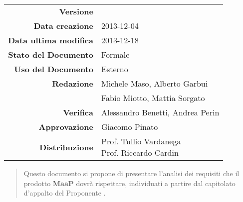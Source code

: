 

\newcommand{\Versione}{\versioneAnalisiDeiRequisiti{}}	%
\newcommand{\Data}{2013-12-04}							%
\newcommand{\DataUltimaModifica}{2013-12-18}
\newcommand{\TipoDocumento}{Analisi dei Requisiti}		%






\begin{center}
\begin{tabular}{r|l}
\textbf{Versione} & \Versione{} \\
\textbf{Data creazione} & \Data{} \\
\textbf{Data ultima modifica} & \DataUltimaModifica{} \\
\textbf{Stato del Documento} & Formale \\					%
\textbf{Uso del Documento} & Esterno \\						%
\textbf{Redazione} & Michele Maso, Alberto Garbui\\			%
				   & Fabio Miotto, Mattia Sorgato\\
\textbf{Verifica} & Alessandro Benetti, Andrea Perin\\		%
\textbf{Approvazione} & Giacomo Pinato\\					%
\textbf{Distribuzione} & \parbox[t]{4cm}{Prof. Tullio Vardanega \\ Prof. Riccardo Cardin \\ \Prop{} }\\
\end{tabular}
\end{center}

\vspace{0.05in}

\begin{abstract}
\begin{center}
Questo documento si propone di presentare l'analisi dei requisiti che il prodotto \textbf{MaaP} dovrà rispettare, individuati a partire dal capitolato d'appalto del Proponente \Prop{}.
\end{center}
\end{abstract}

